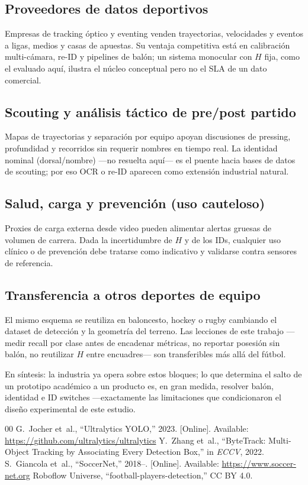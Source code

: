 \documentclass[conference]{IEEEtran}
\begin{document}
\subsection{Proveedores de datos deportivos}
Empresas de tracking óptico y eventing venden trayectorias, velocidades y eventos a ligas, medios y casas de apuestas. Su ventaja competitiva está en calibración multi-cámara, re-ID y pipelines de balón; un sistema monocular con $H$ fija, como el evaluado aquí, ilustra el núcleo conceptual pero no el SLA de un dato comercial.

\subsection{Scouting y análisis táctico de pre/post partido}
Mapas de trayectorias y separación por equipo apoyan discusiones de pressing, profundidad y recorridos sin requerir nombres en tiempo real. La identidad nominal (dorsal/nombre) ---no resuelta aquí--- es el puente hacia bases de datos de scouting; por eso OCR o re-ID aparecen como extensión industrial natural.

\subsection{Salud, carga y prevención (uso cauteloso)}
Proxies de carga externa desde video pueden alimentar alertas gruesas de volumen de carrera. Dada la incertidumbre de $H$ y de los IDs, cualquier uso clínico o de prevención debe tratarse como indicativo y validarse contra sensores de referencia.

\subsection{Transferencia a otros deportes de equipo}
El mismo esquema se reutiliza en baloncesto, hockey o rugby cambiando el dataset de detección y la geometría del terreno. Las lecciones de este trabajo ---medir recall por clase antes de encadenar métricas, no reportar posesión sin balón, no reutilizar $H$ entre encuadres--- son transferibles más allá del fútbol.

En síntesis: la industria ya opera sobre estos bloques; lo que determina el salto de un prototipo académico a un producto es, en gran medida, resolver balón, identidad e ID switches ---exactamente las limitaciones que condicionaron el diseño experimental de este estudio.

\begin{thebibliography}{00}
 G.~Jocher et~al., ``Ultralytics YOLO,'' 2023. [Online]. Available: \url{https://github.com/ultralytics/ultralytics}
 Y.~Zhang et~al., ``ByteTrack: Multi-Object Tracking by Associating Every Detection Box,'' in \emph{ECCV}, 2022.
 S.~Giancola et~al., ``SoccerNet,'' 2018--. [Online]. Available: \url{https://www.soccer-net.org}
 Roboflow Universe, ``football-players-detection,'' CC BY 4.0.
\end{thebibliography}
\end{document}
